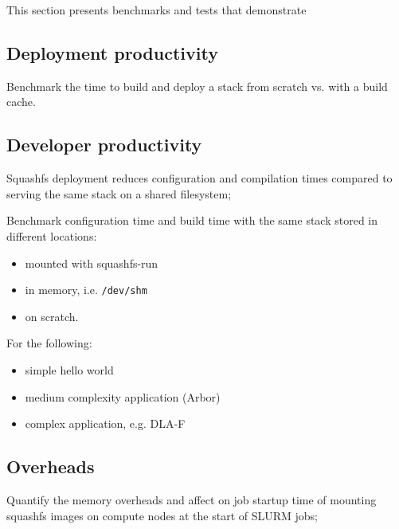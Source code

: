 This section presents benchmarks and tests that demonstrate 

\subsection{Deployment productivity}


Benchmark the time to build and deploy a stack from scratch vs. with a build cache.

\subsection{Developer productivity}


Squashfs deployment reduces configuration and compilation times compared to serving the same stack on a shared filesystem;

Benchmark configuration time and build time with the same stack stored in different locations:
\begin{itemize}
    \item mounted with squashfs-run
    \item in memory, i.e. \lstinline|/dev/shm|
    \item on scratch.
\end{itemize}

For the following:
\begin{itemize}
    \item simple hello world
    \item medium complexity application (Arbor)
    \item complex application, e.g. DLA-F
\end{itemize}

\subsection{Overheads}


Quantify the memory overheads and affect on job startup time of mounting squashfs images on compute nodes at the start of SLURM jobs;

